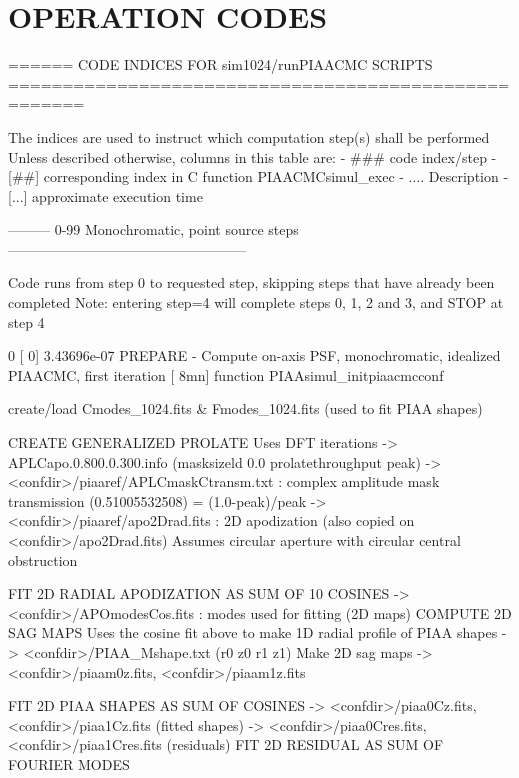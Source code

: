 \section*{O\+P\+E\+R\+A\+T\+I\+O\+N C\+O\+D\+E\+S}

\begin{DoxyVerb}====== CODE INDICES FOR sim1024/runPIAACMC SCRIPTS =====================================================

The indices are used to instruct which computation step(s) shall be performed
Unless described otherwise, columns in this table are:
- ###     code index/step
- [##]   corresponding index in C function PIAACMCsimul_exec
- ....   Description
- [...]  approximate execution time






--------- 0-99  Monochromatic, point source steps ---------------------------------------------------

Code runs from step 0 to requested step, skipping steps that have already been completed
Note: entering step=4 will complete steps 0, 1, 2 and 3, and STOP at step 4

  0     [  0]   3.43696e-07 PREPARE - Compute on-axis PSF, monochromatic, idealized PIAACMC, first iteration  [   8mn]
        function PIAAsimul_initpiaacmcconf
        {
            create/load Cmodes_1024.fits & Fmodes_1024.fits (used to fit PIAA shapes)

            CREATE GENERALIZED PROLATE
            Uses DFT iterations
            -> APLCapo.0.800.0.300.info  (masksizeld 0.0 prolatethroughput peak)
            -> <confdir>/piaaref/APLCmaskCtransm.txt : complex amplitude mask transmission (0.51005532508) = (1.0-peak)/peak
            -> <confdir>/piaaref/apo2Drad.fits : 2D apodization (also copied on <confdir>/apo2Drad.fits)
            Assumes circular aperture with circular central obstruction
                    
            FIT 2D RADIAL APODIZATION AS SUM OF 10 COSINES      
            -> <confdir>/APOmodesCos.fits : modes used for fitting (2D maps)        
            COMPUTE 2D SAG MAPS
            Uses the cosine fit above to make 1D radial profile of PIAA shapes
            -> <confdir>/PIAA_Mshape.txt (r0 z0 r1 z1)
            Make 2D sag maps
            -> <confdir>/piaam0z.fits, <confdir>/piaam1z.fits

            FIT 2D PIAA SHAPES AS SUM OF COSINES
            -> <confdir>/piaa0Cz.fits, <confdir>/piaa1Cz.fits (fitted shapes)
            -> <confdir>/piaa0Cres.fits, <confdir>/piaa1Cres.fits (residuals)
            FIT 2D RESIDUAL AS SUM OF FOURIER MODES

}
\end{DoxyVerb}
